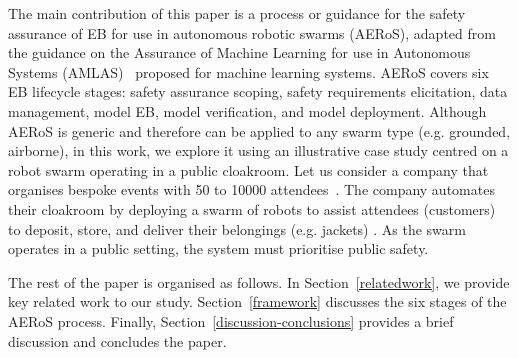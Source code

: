 \documentclass[runningheads]{llncs}
\begin{document}
The main contribution of this paper is a process or guidance for the safety assurance of EB for use in autonomous robotic swarms (AERoS), adapted from the guidance on the Assurance of Machine Learning for use in Autonomous Systems (AMLAS)~\cite{Hawkins2021} proposed for machine learning systems. 
AERoS covers six EB lifecycle stages: safety assurance scoping, safety requirements elicitation, data management, model EB, model verification, and model deployment. 
Although AERoS is generic and therefore can be applied to any swarm type (e.g. grounded, airborne), in this work, we explore it using an illustrative case study centred on a robot swarm operating in a public cloakroom. 
Let us consider a company that organises bespoke events with 50 to 10000 attendees~\cite{Jones2020}. 
The company automates their cloakroom by deploying a swarm of robots to assist attendees (customers) to deposit, store, and deliver their belongings (e.g. jackets) \cite{Jones2020}. 
As the swarm operates in a public setting, the system must prioritise public safety. 

The rest of the paper is organised as follows. 
In Section~\ref{relatedwork}, we provide key related work to our study. Section~\ref{framework} discusses the six stages of the AERoS process. Finally, Section~\ref{discussion-conclusions} provides a brief discussion and concludes the paper. 

\end{document}
